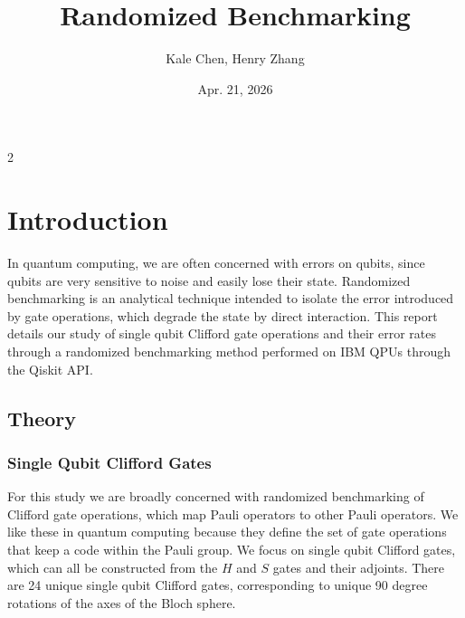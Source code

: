 \documentclass{article}
\title{\textbf{Randomized Benchmarking}}
\author{Kale Chen, Henry Zhang}
\date{Apr. 21, 2026}
\begin{document}
\pagestyle{fancy}

\maketitle

\begin{multicols}{2}

\section{Introduction}

In quantum computing, we are often concerned with errors on qubits, since qubits are very sensitive to noise and easily lose their state. Randomized benchmarking is an analytical technique intended to isolate the error introduced by gate operations, which degrade the state by direct interaction. This report details our study of single qubit Clifford gate operations and their error rates through a randomized benchmarking method performed on IBM QPUs through the Qiskit API.

\subsection{Theory}
\subsubsection{Single Qubit Clifford Gates}
For this study we are broadly concerned with randomized benchmarking of Clifford gate operations, which map Pauli operators to other Pauli operators. We like these in quantum computing because they define the set of gate operations that keep a code within the Pauli group. We focus on single qubit Clifford gates, which can all be constructed from the $H$ and $S$ gates and their adjoints. There are 24 unique single qubit Clifford gates, corresponding to unique 90 degree rotations of the axes of the Bloch sphere.

\end{multicols}
\end{document}
